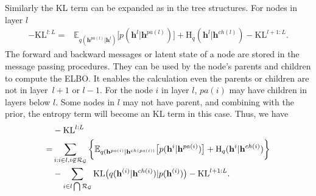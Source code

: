 \documentclass{article} %
\begin{document}
Similarly the KL term can be expanded as in the tree structures. For nodes in layer $l$
\begin{align} \label{eq:KL_dag1}
-\text{KL}^{l:L} 
=&     \mathbb{E}_{q(\mathbf{h}^{pa(l)}|\mathbf{h}^l)} \big[  p( \mathbf{h}^{l}|  \mathbf{h}^{pa(l)})    \big]  +  \text{H}_q(\mathbf{h}^{l}|\mathbf{h}^{ch(l)})  - \text{KL}^{l+1:L}.
\end{align}
The forward and backward messages or latent state of a node are stored in the message passing procedures. They can be used by the node's parents and children  to compute the ELBO.  
It enables the calculation even the parents or children are  not  in layer~$l+1$ or $l-1$. For the node $i$ in layer $l$,   $pa(i)$ may have children in layers below $l$. Some nodes in $l$ may not have parent, and combining with the prior, the entropy term will become an KL term in this case.  Thus,  we have 
\begin{align} \label{eq:KL_dag2}
&-\text{KL}^{l:L} \\ \notag
=&   \sum_{i:i\in l, i \not\in   \mathcal{R}_{ \mathcal{G}} }  \bigg\{ \mathbb{E}_{q(\mathbf{h}^{pa(i)}|\mathbf{h}^{ch(pa(i))}} \big[  p( \mathbf{h}^{i}|  \mathbf{h}^{pa(i)})    \big]   +  \text{H}_q(\mathbf{h}^{i}|\mathbf{h}^{ch(i)})  \bigg\}  \\ \notag
& -  \sum_{i \in l \bigcap \mathcal{R}_{ \mathcal{G} }  }  \text{KL}\big(q(\mathbf{h}^{(i)} | \mathbf{h}^{ch(i)} )   | p(\mathbf{h}^{(i)})  \big)  - \text{KL}^{l+1:L}. \notag
\end{align}
\end{document}
